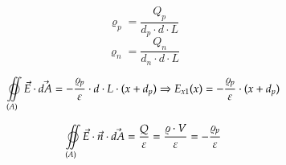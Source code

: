 \[ \varrho_p = \dfrac{Q_p}{d_p\cdot d\cdot L} \] %
\[ \varrho_n = \dfrac{Q_n}{d_n\cdot d\cdot L} \] %

\[\varoiint\limits_{(A)}\vec{E}\cdot\vec{dA} = -\dfrac{\varrho_p}{\varepsilon}\cdot d\cdot L\cdot (x + d_p) \Rightarrow E_{x1}(x) = -\dfrac{\varrho_p}{\varepsilon}\cdot (x + d_p) \]

\[ \varoiint\limits_{(A)}\vec{E}\cdot\vec{n}\cdot \vec{dA} =  \dfrac{Q}{\varepsilon} = \dfrac{\varrho\cdot V}{\varepsilon} = -\dfrac{\varrho_p}{\varepsilon} \]
\clearpage
\pagebreak
